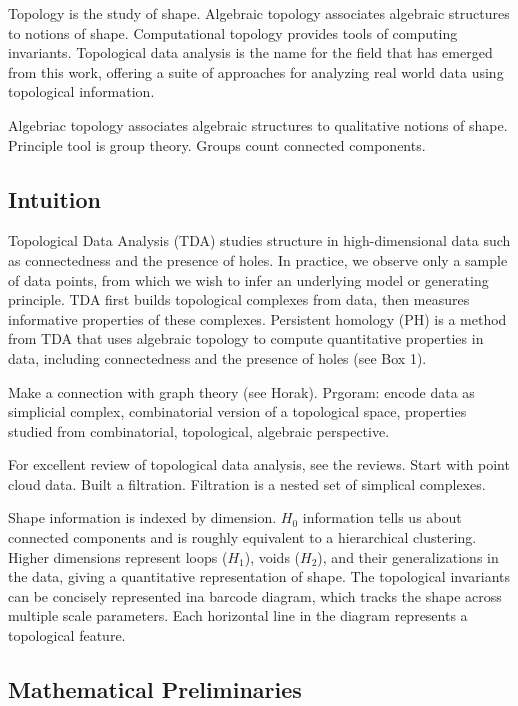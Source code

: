 Topology is the study of shape.
Algebraic topology associates algebraic structures to notions of shape.
Computational topology provides tools of computing invariants.
Topological data analysis is the name for the field that has emerged from this work, offering a suite of approaches for analyzing real world data using topological information.

Algebriac topology associates algebraic structures to qualitative notions of shape.
Principle tool is group theory.
Groups count connected components.

\subsection{Intuition}

Topological Data Analysis (TDA) studies structure in high-dimensional data such as connectedness and the presence of holes.
In practice, we observe only a sample of data points, from which we wish to infer an underlying model or generating principle.
TDA first builds topological complexes from data, then measures informative properties of these complexes. 
Persistent homology (PH) is a method from TDA that uses algebraic topology to compute quantitative properties in data, including connectedness and the presence of holes (see Box 1).

Make a connection with graph theory (see Horak). Prgoram: encode data as simplicial complex, combinatorial version of a topological space, properties studied from combinatorial, topological, algebraic perspective.

For excellent review of topological data analysis, see the reviews.
Start with point cloud data.
Built a filtration.
Filtration is a nested set of simplical complexes.

Shape information is indexed by dimension. $H_0$ information tells us about connected components and is roughly equivalent to a hierarchical clustering.
Higher dimensions represent loops ($H_1$), voids ($H_2$), and their generalizations in the data, giving a quantitative representation of shape.
The topological invariants can be concisely represented ina barcode diagram, which tracks the shape across multiple scale parameters.
Each horizontal line in the diagram represents a topological feature.

\subsection{Mathematical Preliminaries}

